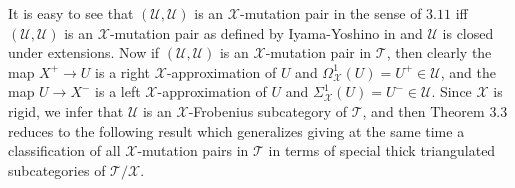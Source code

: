 \documentclass[oneside, a4paper,reqno]{amsart}
\numberwithin{equation}{section}
\theoremstyle{definition}
\begin{document}
It is easy to see that $({\mathcal U},{\mathcal U})$ is an ${\mathcal X}$-mutation pair in the sense of $3.11$ iff $({\mathcal U},{\mathcal U})$ is an ${\mathcal X}$-mutation pair as defined by Iyama-Yoshino in \cite[Section 2]{IY} and ${\mathcal U}$ is closed under extensions. Now if $({\mathcal U},{\mathcal U})$ is an ${\mathcal X}$-mutation pair in ${\mathcal T}$, then clearly the map $X^{+} {\longrightarrow} U$ is a right ${\mathcal X}$-approximation of $U$ and $\Omega^{1}_{\mathcal X}(U) = U^{+} \in {\mathcal U}$, and the map $U {\longrightarrow} X^{-}$ is a left ${\mathcal X}$-approximation of $U$ and $\Sigma^{1}_{\mathcal X}(U) = U^{-} \in {\mathcal U}$. Since ${\mathcal X}$ is rigid, we infer that ${\mathcal U}$ is an ${\mathcal X}$-Frobenius subcategory of ${\mathcal T}$, and then Theorem $3.3$ reduces to the following result which generalizes \cite[Theorem 4.2]{IY} giving at the same time  a classification of all ${\mathcal X}$-mutation pairs in ${\mathcal T}$  in terms of special thick triangulated subcategories of ${\mathcal T}/{\mathcal X}$.
\end{document}
